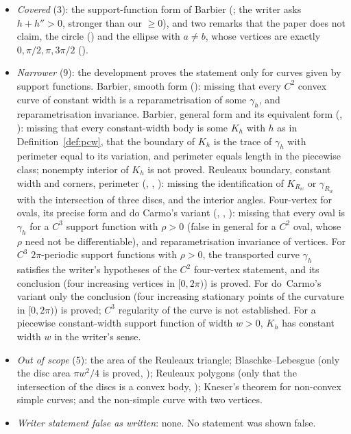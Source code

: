\documentclass[11pt]{article}
\theoremstyle{definition}
\theoremstyle{remark}
\begin{document}
\begin{itemize}
\item \emph{Covered} (3): the support-function form of Barbier (;
the writer asks $h+h''>0$, stronger than our $\ge 0$), and two remarks that the paper does not claim,
the circle () and the ellipse with $a\ne b$, whose
vertices are exactly $0,\pi/2,\pi,3\pi/2$ ().
\item \emph{Narrower} (9): the development proves the statement only for curves given by support
functions. Barbier, smooth form (): missing that every $C^2$
convex curve of constant width is a reparametrisation of some $\gamma_h$, and reparametrisation
invariance. Barbier, general form and its equivalent form
(, ): missing that every
constant-width body is some $K_h$ with $h$ as in Definition~\ref{def:pcw}, that the boundary of $K_h$
is the trace of $\gamma_h$ with perimeter equal to its variation, and perimeter equals length in the
piecewise class; nonempty interior of $K_h$ is not proved. Reuleaux boundary, constant width and
corners, perimeter (, ,
): missing the identification of $K_{R_w}$ or $\gamma_{R_w}$ with the
intersection of three discs, and the interior angles. Four-vertex for ovals, its precise form and do
Carmo's variant (, ,
): missing that every oval is $\gamma_h$ for a $C^3$
support function with $\rho>0$ (false in general for a $C^2$ oval, whose $\rho$ need not be
differentiable), and reparametrisation invariance of vertices. For $C^3$ $2\pi$-periodic support functions with
$\rho>0$, the transported curve $\gamma_h$ satisfies the writer's hypotheses of the $C^2$ four-vertex
statement, and its conclusion (four increasing vertices in $[0,2\pi)$) is proved. For do~Carmo's
variant only the conclusion (four increasing stationary points of the curvature in $[0,2\pi)$) is
proved; $C^3$ regularity of the curve is not established. For a piecewise constant-width support
function of width $w>0$, $K_h$ has constant width $w$ in the writer's sense.
\item \emph{Out of scope} (5): the area of the Reuleaux triangle; Blaschke--Lebesgue (only the
disc area $\pi w^2/4$ is proved, ); Reuleaux polygons (only that
the intersection of the discs is a convex body, ); Kneser's
theorem for non-convex simple curves; and the non-simple curve with two vertices.
\item \emph{Writer statement false as written}: none. No statement was shown false.
\end{itemize}
\end{document}
